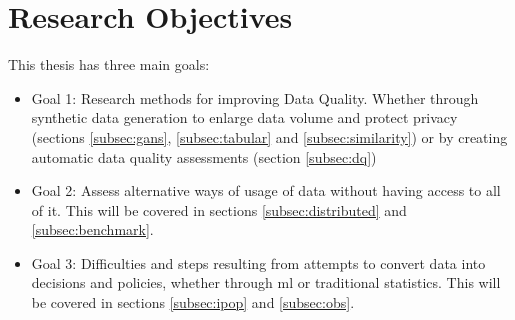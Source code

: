 
\section{Research Objectives}
This thesis has three main goals:


\begin{itemize}
    \item Goal 1: Research methods for improving Data Quality. Whether through synthetic data generation to enlarge data volume and protect privacy (sections \ref{subsec:gans}, \ref{subsec:tabular} and \ref{subsec:similarity}) or by creating automatic data quality assessments  (section \ref{subsec:dq})

    \item Goal 2: Assess alternative ways of usage of data without having access to all of it. This will be covered in sections \ref{subsec:distributed} and \ref{subsec:benchmark}.

    \item Goal 3: Difficulties and steps resulting from attempts to convert data into decisions and policies, whether through \ac{ml} or traditional statistics. This will be covered in sections \ref{subsec:ipop} and \ref{subsec:obs}.
\end{itemize}